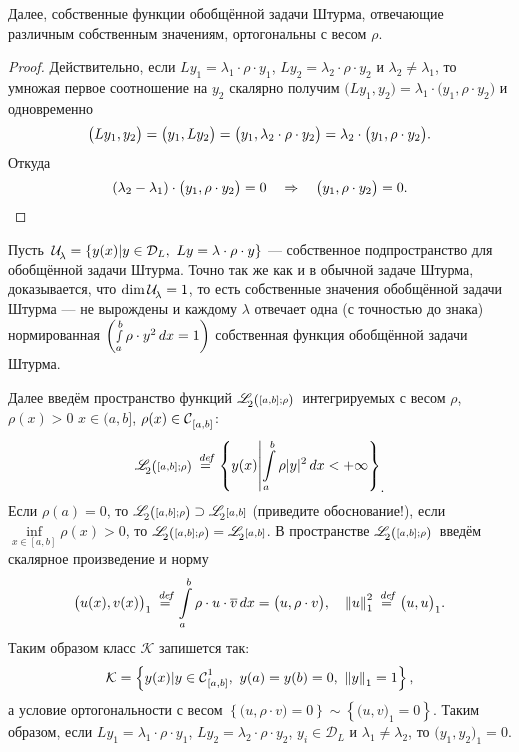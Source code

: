 \documentclass[12pt,a4paper,openany,fleqn]{book}
\newcommand {\defeq}{\stackrel{\hspace{0.09 cm}de\!f}{=}}
\newcommand {\eqdef}{\defeq}
\newcommand{\Cf}{\ensuremath{\mathcal{C}}}
\newcommand{\mc}[1]{\ensuremath{\mathcal{#1}}}
\newcommand{\Cfn}[2][]{\ensuremath{\Cf{\mathstrut}^{#2}_{#1}}}
\newcommand{\K}{\mc{K}}
\newcommand{\fL}[1][{[a,b]}]{\ensuremath{\mathscr{L}\hspace*{-0.11 cm}{\mathstrut}_{2}{\scriptstyle#1}}}
\newcommand{\norm}[1]{\ensuremath{\left\|#1\right\|}}
\newcommand{\Ul}[1][\lambda]{\ensuremath{\mc{U}\!{\mathstrut}_{#1}}}
\newcommand{\fLr}[1][{[a,b];\rho}]{\ensuremath{\mathscr{L}\hspace*{-0.11 cm}{\mathstrut}_{2}{\scriptstyle\left(\vphantom{A^b}#1\right)}}}
\theoremstyle{definition}
\begin{document}
	Далее, собственные функции обобщённой задачи Штурма, отвечающие различным собственным значениям, ортогональны с весом $\rho$. 
	\begin{proof}
		Действительно, если $Ly_1=\lambda_1\cdot\rho\cdot y_1$, $Ly_2=\lambda_2\cdot\rho\cdot y_2$ и $\lambda_2\neq\lambda_1$, то умножая первое соотношение на $y_2$ скалярно получим $\big(Ly_1,y_2\big)=\lambda_1\cdot\big(y_1,\rho\cdot y_2\big)$ и одновременно
		\begin{equation}
			\label{l8:eq:3}
			\hfill\big(Ly_1,y_2\big)=\big(y_1,Ly_2\big)=\big(y_1,\lambda_2\cdot\rho\cdot y_2\big)=\lambda_2\cdot\big(y_1,\rho\cdot y_2\big).\hfill
		\end{equation}	
		Откуда 
		\begin{equation}
			\hfill(\lambda_2-\lambda_1)\cdot\big(y_1,\rho\cdot y_2\big)=0\quad\Rightarrow\quad\big(y_1,\rho\cdot y_2\big)=0.\hfill
		\end{equation}
	\end{proof}

	Пусть\  $\Ul=\left\{y(x)|y\in\mc{D}_L,\ Ly=\lambda\cdot\rho\cdot y\right\}$ --- собственное подпространство для обобщённой задачи Штурма. Точно так же как и в обычной задаче Штурма, доказывается, что $\dim\Ul=1$, то есть собственные значения обобщённой задачи Штурма --- не вырождены и каждому $\lambda$ отвечает одна (с точностью до знака) нормированная $\left(\smallint\limits_a^b\rho\cdot y^2\,dx=1\right)$ собственная функция обобщённой задачи Штурма.
	 
	Далее введём пространство функций \fLr\ интегрируемых с весом $\rho$, $\rho(x)>0$ $x\in(a,b]$, $\rho(x)\in\Cfn[{[a,b]}]{}$:
	\begin{equation*}
		\hfill\fLr\eqdef\left\{y(x)\middle| \int\limits_a^b\rho|y|^2\,dx<+\infty\right\}_{\displaystyle.}\hfill
	\end{equation*}
	Если $\rho(a)=0$, то $\fLr\supset\fL$ (приведите обоснование!), если $\displaystyle\inf\limits_{x\in[a,b]}\rho(x)>0$, то $\fLr=\fL$. В пространстве \fLr\ введём скалярное произведение и норму
	\begin{equation*}
		\hfill\big(u(x),v(x)\big)_1\eqdef\int\limits_a^b\rho\cdot u\cdot\overline{v}\,dx=\big(u,\rho\cdot v\big),\quad{\norm{u}}_1^2\eqdef\big(u,u\big)_1.\hfill
	\end{equation*}
	Таким образом класс $\K$ запишется так:
	\begin{equation*}
		\hfill\K=\left\{y(x)|y\in\Cfn[{[a,b]}]{1},\ y(a)=y(b)=0,\ \norm{y}_1=1\right\},\hfill
	\end{equation*}
	а условие ортогональности с весом $\left\{\big(u,\rho\cdot v\big)=0\right\}\sim\left\{\big(u,v\big)_1=0\right\}$. Таким образом, если $Ly_1=\lambda_1\cdot\rho\cdot y_1$, $Ly_2=\lambda_2\cdot\rho\cdot y_2$, $y_i\in\mc{D}_L$ и $\lambda_1\neq\lambda_2$, то $\big(y_1,y_2\big)_1=0$.
	
\end{document}
